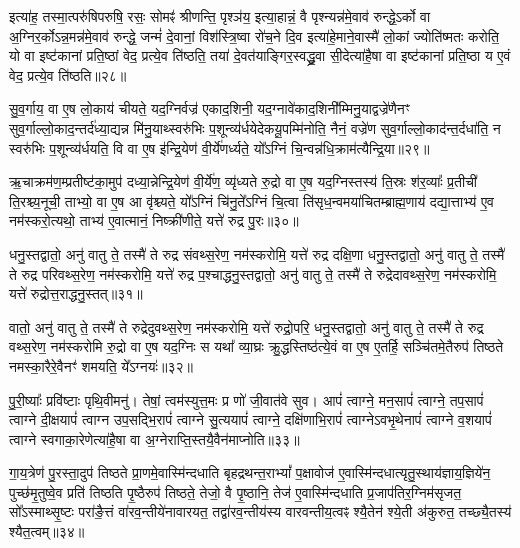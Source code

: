 इत्या॑ह॒ तस्मा॒त्परु॑षिपरुषि॒ रसः॒ सोमꣴ॑ श्रीणन्ति॒ पृश्ञ॑य॒ इत्या॒हान्नं॒ वै पृश्न्यन्न॑मे॒वाव॑ रुन्द्धे॒\-ऽर्को वा अ॒ग्निर॒र्को\-ऽन्न॒मन्न॑मे॒वाव॑ रुन्द्धे॒ जन्मं॑ दे॒वानां॒ विश॑स्त्रि॒ष्वा रो॑च॒ने दि॒व इत्या॑हे॒माने॒वास्मै॑ लो॒कां ज्योति॑ष्मतः करोति॒ यो वा इष्ट॑कानां प्रति॒ष्ठां वेद॒ प्रत्ये॒व ति॑ष्ठति॒ तया॑ दे॒वत॑याङ्गिर॒स्वद्ध्रु॒वा सी॒देत्या॑है॒षा वा इष्ट॑कानां प्रति॒ष्ठा य ए॒वं वेद॒ प्रत्ये॒व ति॑ष्ठति॥२८॥

{\anuvakamend[{रू॒पाणि॒ सूद॑दोहस॒स्तया॒ षोड॑श च॥६॥}]}

सु॒व॒र्गाय॒ वा ए॒ष लो॒काय॑ चीयते॒ यद॒ग्निर्वज्र॑ एकाद॒शिनी॒ यद॒ग्नावे॑काद॒शिनी᳚म्मिनु॒याद्वज्रे॑णैनꣳ सुव॒र्गाल्लो॒का\-द॒न्तर्द॑ध्या॒द्यन्न मि॑नु॒याथ्स्वरु॑भिः प॒शून्व्य॑र्धयेदेकयू॒पम्मि॑नोति॒ नैनं॒ वज्रे॑ण सुव॒र्गाल्लो॒काद॑न्त॒र्दधा॑ति॒ न स्वरु॑भिः प॒शून्व्य॑र्धयति॒ वि वा ए॒ष इ॑न्द्रि॒येण॑ वी॒र्ये॑णर्ध्यते॒ यो᳚\-ऽग्निं चि॒न्वन्न॑धि॒क्राम॑त्यैन्द्रि॒या॥२९॥

ऋ॒चाक्रम॑ण॒म्प्रतीष्ट॑का॒मुप॑ दध्या॒न्नेन्द्रि॒येण॑ वी॒र्ये॑ण॒ व्यृ॑ध्यते रु॒द्रो वा ए॒ष यद॒ग्निस्तस्य॑ ति॒स्रः श॑र॒व्याः᳚ प्र॒तीची॑ ति॒रश्च्य॒नूची॒ ताभ्यो॒ वा ए॒ष आ वृ॑श्च्यते॒ यो᳚\-ऽग्निं चि॑नु॒ते᳚\-ऽग्निं चि॒त्वा ति॑सृध॒न्वमया॑चितम्ब्राह्म॒णाय॑ दद्या॒त्ताभ्य॑ ए॒व नम॑स्करो॒त्यथो॒ ताभ्य॑ ए॒वात्मानं॒ निष्क्री॑णीते॒ यत्ते॑ रुद्र पु॒रः॥३०॥

धनु॒स्तद्वातो॒ अनु॑ वातु ते॒ तस्मै॑ ते रुद्र संवथ्स॒रेण॒ नम॑स्करोमि॒ यत्ते॑ रुद्र दक्षि॒णा धनु॒स्तद्वातो॒ अनु॑ वातु ते॒ तस्मै॑ ते रुद्र परिवथ्स॒रेण॒ नम॑स्करोमि॒ यत्ते॑ रुद्र प॒श्चाद्धनु॒स्तद्वातो॒ अनु॑ वातु ते॒ तस्मै॑ ते रुद्रेदावथ्स॒रेण॒ नम॑स्करोमि॒ यत्ते॑ रुद्रोत्त॒राद्धनु॒स्तत्॥३१॥

वातो॒ अनु॑ वातु ते॒ तस्मै॑ ते रुद्रेदुवथ्स॒रेण॒ नम॑स्करोमि॒ यत्ते॑ रुद्रो॒परि॒ धनु॒स्तद्वातो॒ अनु॑ वातु ते॒ तस्मै॑ ते रुद्र वथ्स॒रेण॒ नम॑स्करोमि रु॒द्रो वा ए॒ष यद॒ग्निः स यथा᳚ व्या॒घ्रः क्रु॒द्धस्तिष्ठ॑त्ये॒वं वा ए॒ष ए॒तर्\mbox{}हि॒ सञ्चि॑तमे॒तैरुप॑ तिष्ठते नमस्का॒रैरे॒वैनꣳ॑ शमयति॒ ये᳚\-ऽग्नयः॑॥३२॥

पु॒री॒ष्याः᳚ प्रवि॑ष्टाः पृथि॒वीमनु॑। तेषां॒ त्वम॑स्युत्त॒मः प्र णो॑ जी॒वात॑वे सुव। आपं॑ त्वाग्ने॒ मन॒सापं॑ त्वाग्ने॒ तप॒सापं॑ त्वाग्ने दी॒क्षयापं॑ त्वाग्न उप॒सद्भि॒रापं॑ त्वाग्ने सु॒त्ययापं॑ त्वाग्ने॒ दक्षि॑णाभि॒रापं॑ त्वाग्ने\-ऽवभृ॒थेनापं॑ त्वाग्ने व॒शयापं॑ त्वाग्ने स्वगाका॒रेणेत्या॑है॒षा वा अ॒ग्नेराप्ति॒स्तयै॒वैन॑माप्नोति॥३३॥

{\anuvakamend[{ऐ॒न्द्रि॒या पु॒र उ॑त्त॒राद्धनु॒स्तद॒ग्नय॑ आहा॒ष्टौ च॑॥७॥}]}

गा॒य॒त्रेण॑ पु॒रस्ता॒दुप॑ तिष्ठते प्रा॒णमे॒वास्मि॑न्दधाति बृहद्रथन्त॒रा\-भ्यां᳚ प॒क्षावोज॑ ए॒वास्मि॑न्दधात्यृतु॒स्थाय॑ज्ञाय॒ज्ञिये॑न॒ पुच्छ॑मृ॒तुष्वे॒व प्रति॑ तिष्ठति पृ॒ष्ठैरुप॑ तिष्ठते॒ तेजो॒ वै पृ॒ष्ठानि॒ तेज॑ ए॒वास्मि॑न्दधाति प्र॒जाप॑तिर॒ग्निम॑सृजत॒ सो᳚\-ऽस्माथ्सृ॒ष्टः परा॑ङै॒त्तं वा॑रव॒न्तीये॑नावारयत॒ तद्वा॑रव॒न्तीय॑स्य वारवन्तीय॒त्वꣴ श्यै॒तेन॑ श्ये॒ती अ॑कुरुत॒ तच्छ्यै॒तस्य॑ श्यैत॒त्वम्॥३४॥

